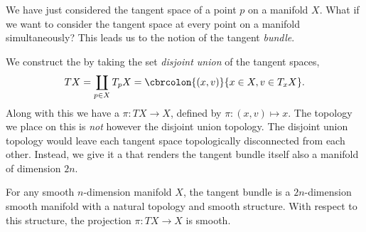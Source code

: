 We have just considered the tangent space of a point \(p\) on a manifold \(X\).
What if we want to consider the tangent space at every point on a manifold simultaneously?
This leads us to the notion of the tangent \emph{bundle}.

We construct the  by taking the set \emph{disjoint union} of the tangent spaces, \[TX = \disjointU_{p\in X} T_pX = \cbrcolon{(x, v)}{x\in X, v\in T_xX}.\]
Along with this we have a  \(\pi : TX \to X\), defined by \(\pi: (x, v) \mapsto x\).
The topology we place on this is \emph{not} however the disjoint union topology.
The disjoint union topology would leave each tangent space topologically disconnected from each other.
Instead, we give it a  that renders the tangent bundle itself also a manifold of dimension \(2n\).

\begin{proposition}
	For any smooth \(n\)-dimension manifold \(X\), the tangent bundle is a \(2n\)-dimension smooth manifold with a natural topology and smooth structure.
	With respect to this structure, the projection \(\pi: TX \to X\) is smooth.
\end{proposition} 

